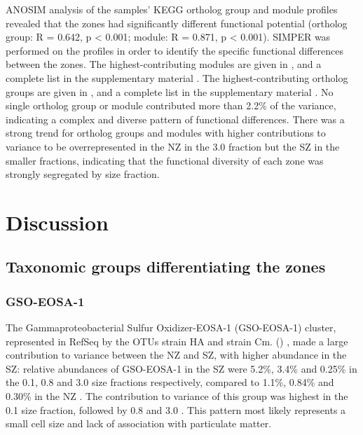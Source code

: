 \ac{ANOSIM} analysis of the samples' \ac{KEGG} ortholog group and module profiles revealed that the zones had significantly different functional potential (ortholog group: R = 0.642, p < 0.001; module: R = 0.871, p < 0.001). 
\ac{SIMPER} was performed on the profiles in order to identify the specific functional differences between the zones. 
The highest-contributing modules are given in , and a complete list in the supplementary material .
The highest-contributing ortholog groups are given in , and a complete list in the supplementary material .
No single ortholog group or module contributed more than 2.2\% of the variance, indicating a complex and diverse pattern of functional differences. 
There was a strong trend for ortholog groups and modules with higher contributions to variance to be overrepresented in the \ac{NZ} in the 3.0 \micron{} fraction but the \ac{SZ} in the smaller fractions, indicating that the functional diversity of each zone was strongly segregated by size fraction.




\section{Discussion}

\subsection{Taxonomic groups differentiating the zones}

\subsubsection{GSO-EOSA-1}

The Gammaproteobacterial Sulfur Oxidizer-EOSA-1 (GSO-EOSA-1) cluster, represented in RefSeq by the \acp{OTU}  strain HA and  strain Cm. () \cite{Walsh:2009fja}, made a large contribution to variance between the \ac{NZ} and \ac{SZ}, with higher abundance in the \ac{SZ}: relative abundances of GSO-EOSA-1 in the \ac{SZ} were 5.2\%, 3.4\% and 0.25\% in the 0.1, 0.8 and 3.0 \micron{} size fractions respectively, compared to 1.1\%, 0.84\% and 0.30\% in the \ac{NZ} .
The contribution to variance of this group was highest in the 0.1 \micron{} size fraction, followed by 0.8 \micron{} and 3.0 \micron{} .
This pattern most likely represents a small cell size and lack of association with particulate matter.

